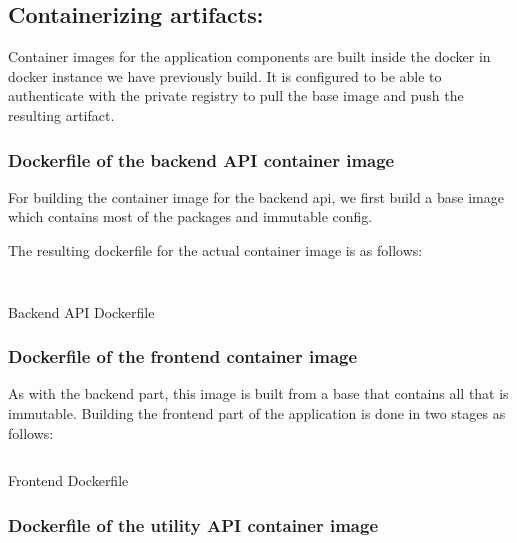 \subsection{Containerizing artifacts:}

Container images for the application components are built inside the docker in docker instance we have previously build. It is configured to be able to authenticate with the private registry to pull the base image and push the resulting artifact. 

\subsubsection{Dockerfile of the backend API container image }

For building the container image for the backend api, we first build a base image which contains most of the packages and immutable config. 

The resulting dockerfile for the actual container image is as follows: 

\begin{listing}[H]
    \inputminted[firstline=1,lastline=30]{Dockerfile}{codeListing/syst_backend_Dockerfile}
\end{listing}
\begin{listing}[H]
     \inputminted[firstline=31]{Dockerfile}{codeListing/syst_backend_Dockerfile}
    \caption{Backend API Dockerfile}
    \label{lst:API Dockerfile}
\end{listing}
 

\subsubsection{Dockerfile of the frontend container image }

As with the backend part, this image is built from a base that contains all that is immutable. Building the frontend part of the application is done in two stages as follows: 

 \begin{listing}[H]
    \inputminted{Dockerfile}{codeListing/syst_frontend_Dockerfile}
    \caption{Frontend Dockerfile}
    \label{lst:Dind Dockerfile}
\end{listing}

\subsubsection{Dockerfile of the utility API container image} 

